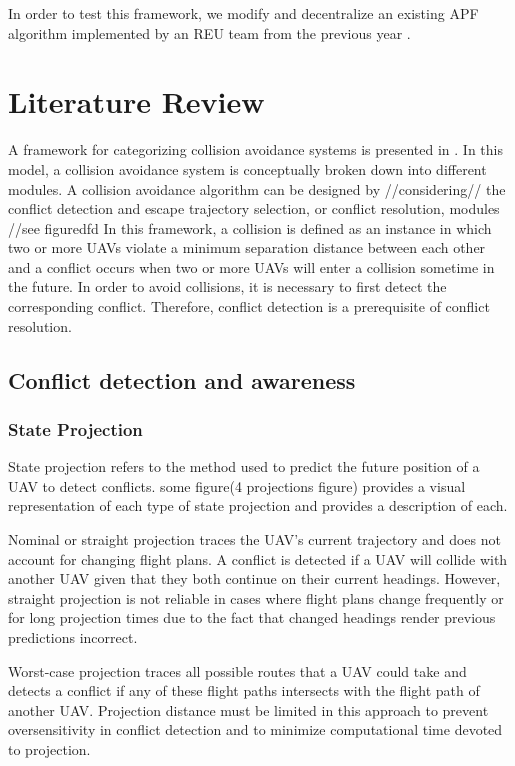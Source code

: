\documentclass[conference]{IEEEtran}
\begin{document}
In order to test this framework, we modify and decentralize an existing APF algorithm implemented by an REU team from the previous year \cite{siudynamic}.


\section{Literature Review}
\label{sec:litReview}
A framework for categorizing collision avoidance systems is presented in \cite{albaker2009survey}.  In this model, a collision avoidance system is conceptually broken down into different modules.  A collision avoidance algorithm can be designed by //considering// the conflict detection and escape trajectory selection, or conflict resolution, modules //see figuredfd  In this framework, a collision is defined as an instance in which two or more UAVs violate a minimum separation distance between each other and a conflict occurs when two or more UAVs will enter a collision sometime in the future. In order to avoid collisions, it is necessary to first detect the corresponding conflict.  Therefore, conflict detection is a prerequisite of conflict resolution.

\subsection{Conflict detection and awareness}


\subsubsection{State Projection}
State projection refers to the method used to predict the future position of a UAV to detect conflicts. some figure(4 projections figure) provides a visual representation of each type of state projection and \cite{albaker2009survey} provides a description of each.

Nominal or straight projection traces the UAV’s current trajectory and does not account for changing flight plans.  A conflict is detected if a UAV will collide with another UAV given that they both continue on their current headings.  However, straight projection is not reliable in cases where flight plans change frequently or for long projection times due to the fact that changed headings render previous predictions incorrect.

Worst-case projection traces all possible routes that a UAV could take and detects a conflict if any of these flight paths intersects with the flight path of another UAV.  Projection distance must be limited in this approach to prevent oversensitivity in conflict detection and to minimize computational time devoted to projection.
\end{document}
